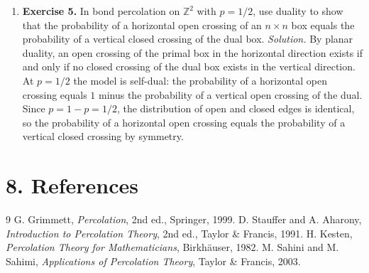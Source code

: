 \begin{enumerate}[leftmargin=*,itemsep=0.9em]
\item \textbf{Exercise 5.} In bond percolation on $\mathbb{Z}^2$ with $p=1/2$, use duality to show that the probability of a horizontal open crossing of an $n\times n$ box equals the probability of a vertical closed crossing of the dual box. \emph{Solution.} By planar duality, an open crossing of the primal box in the horizontal direction exists if and only if no closed crossing of the dual box exists in the vertical direction. At $p=1/2$ the model is self-dual: the probability of a horizontal open crossing equals $1$ minus the probability of a vertical open crossing of the dual. Since $p=1-p=1/2$, the distribution of open and closed edges is identical, so the probability of a horizontal open crossing equals the probability of a vertical closed crossing by symmetry.

\end{enumerate}
\section*{8. References}
\begin{thebibliography}{9}
 G. Grimmett, \emph{Percolation}, 2nd ed., Springer, 1999.
 D. Stauffer and A. Aharony, \emph{Introduction to Percolation Theory}, 2nd ed., Taylor \& Francis, 1991.
 H. Kesten, \emph{Percolation Theory for Mathematicians}, Birkhäuser, 1982.
 M. Sahini and M. Sahimi, \emph{Applications of Percolation Theory}, Taylor \& Francis, 2003.
\end{thebibliography}

